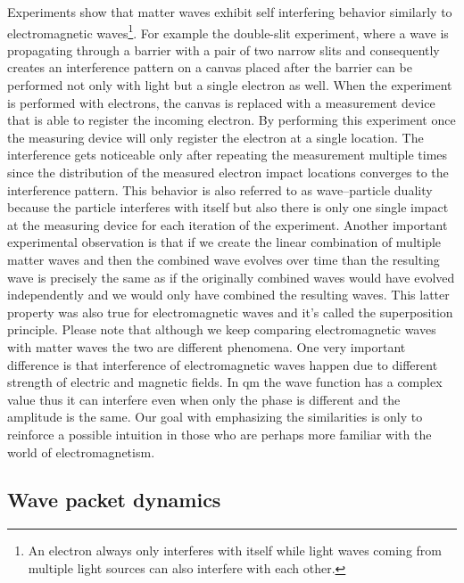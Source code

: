 Experiments show that matter waves exhibit self interfering behavior similarly to electromagnetic waves\footnote{An electron always only interferes with itself while light waves coming from multiple light sources can also interfere with each other.}.
For example the double-slit experiment, where a wave is propagating through a barrier with a pair of two narrow slits and consequently creates an interference pattern on a canvas placed after the barrier can be performed not only with light but a single electron as well.
When the experiment is performed with electrons, the canvas is replaced with a measurement device that is able to register the incoming electron.
By performing this experiment once the measuring device will only register the electron at a single location.
The interference gets noticeable only after repeating the measurement multiple times since the distribution of the measured electron impact locations converges to the interference pattern.
This behavior is also referred to as wave–particle duality because the particle interferes with itself but also there is only one single impact at the measuring device for each iteration of the experiment.
Another important experimental observation is that if we create the linear combination of multiple matter waves and then the combined wave evolves over time than the resulting wave is precisely the same as if the originally combined waves would have evolved independently and we would only have combined the resulting waves.
This latter property was also true for electromagnetic waves and it's called the superposition principle.
Please note that although we keep comparing electromagnetic waves with matter waves the two are different phenomena.
One very important difference is that interference of electromagnetic waves happen due to different strength of electric and magnetic fields.
In \acrshort{qm} the wave function has a complex value thus it can interfere even when only the phase is different and the amplitude is the same.
Our goal with emphasizing the similarities is only to reinforce a possible intuition in those who are perhaps more familiar with the world of electromagnetism.

\subsection{Wave packet dynamics}

